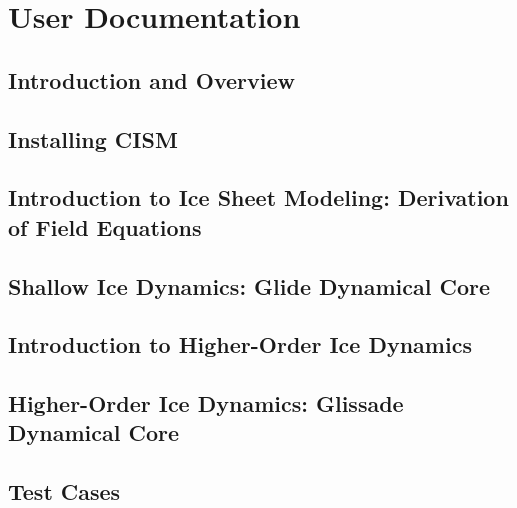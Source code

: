 \mainmatter
\part{User Documentation}

\chapter{Introduction and Overview}
\newcommand{\dir}{intro}


\chapter{Installing CISM}
\renewcommand{\dir}{install}


\chapter{Introduction to Ice Sheet Modeling: Derivation of Field Equations}
\renewcommand{\dir}{modeling-intro}


\chapter{Shallow Ice Dynamics: Glide Dynamical Core}
\renewcommand{\dir}{shallow-ice}


\chapter{Introduction to Higher-Order Ice Dynamics}
\renewcommand{\dir}{higher-order}


\chapter{Higher-Order Ice Dynamics: Glissade Dynamical Core}
\renewcommand{\dir}{glissade}


%

\chapter{Test Cases}
\label{sec:testcases}
\renewcommand{\dir}{tests}



